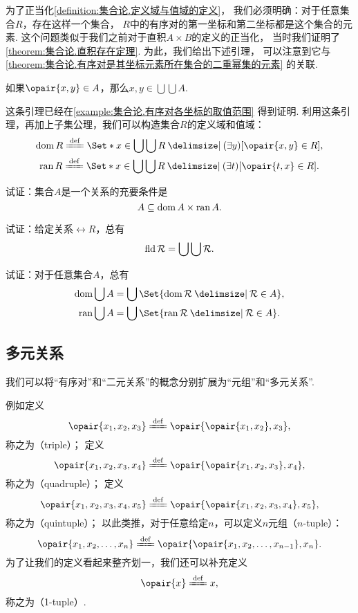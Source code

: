 为了正当化\cref{definition:集合论.定义域与值域的定义}，
我们必须明确：对于任意集合\(R\)，存在这样一个集合，
\(R\)中的有序对的第一坐标和第二坐标都是这个集合的元素.
这个问题类似于我们之前对于直积\(A \times B\)的定义的正当化，
当时我们证明了\cref{theorem:集合论.直积存在定理}.
为此，我们给出下述引理，
可以注意到它与\cref{theorem:集合论.有序对是其坐标元素所在集合的二重幂集的元素} 的关联.

\begin{lemma}
如果\(\opair{x,y} \in A\)，那么\(x,y \in \bigcup\bigcup A\).
\end{lemma}
这条引理已经在\cref{example:集合论.有序对各坐标的取值范围} 得到证明.
利用这条引理，再加上子集公理，我们可以构造集合\(R\)的定义域和值域：
\begin{gather}
	\dom R
	\defeq
	\Set*{ x \in \bigcup\bigcup R \given (\exists y)[\opair{x,y} \in R] }, \\
	\ran R
	\defeq
	\Set*{ x \in \bigcup\bigcup R \given (\exists t)[\opair{t,x} \in R] }.
\end{gather}

\begin{example}
试证：集合\(A\)是一个关系的充要条件是\[
	A \subseteq \operatorname{dom} A \times \operatorname{ran} A.
\]
\end{example}

\begin{example}
试证：给定关系\(\rel{R}\)，总有\[
	\operatorname{fld} \mathcal{R} = \bigcup\bigcup \mathcal{R}.
\]
\end{example}

\begin{example}
试证：对于任意集合\(A\)，总有\begin{gather}
	\dom\bigcup A = \bigcup\Set{ \dom\rel{R} \given \rel{R} \in A }, \\
	\ran\bigcup A = \bigcup\Set{ \ran\rel{R} \given \rel{R} \in A }.
\end{gather}
\end{example}

\subsection{多元关系}
我们可以将“有序对”和“二元关系”的概念分别扩展为“元组”和“多元关系”.

例如定义\[
	\opair{x_1,x_2,x_3}
	\defeq
	\opair{\opair{x_1,x_2},x_3},
\]
称之为（triple）；
定义\[
	\opair{x_1,x_2,x_3,x_4}
	\defeq
	\opair{\opair{x_1,x_2,x_3},x_4},
\]
称之为（quadruple）；
定义\[
	\opair{x_1,x_2,x_3,x_4,x_5}
	\defeq
	\opair{\opair{x_1,x_2,x_3,x_4},x_5},
\]
称之为（quintuple）；
以此类推，对于任意给定\(n\)，可以定义\(n\)元组（\(n\)-tuple）：\[
	\opair{x_1,x_2,\dotsc,x_n}
	\defeq
	\opair{\opair{x_1,x_2,\dotsc,x_{n-1}},x_n}.
\]
为了让我们的定义看起来整齐划一，我们还可以补充定义\[
	\opair{x} \defeq x,
\]
称之为（1-tuple）.

